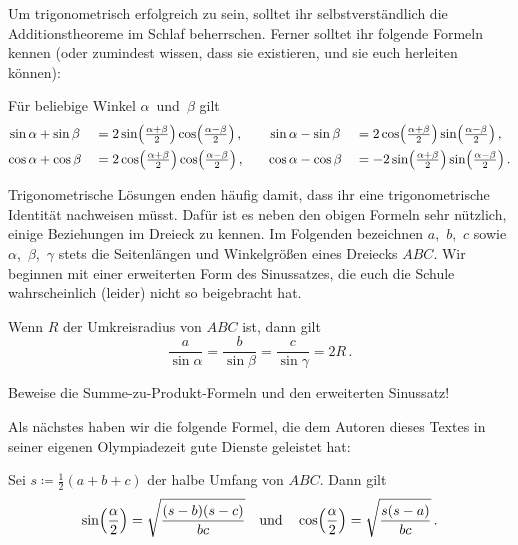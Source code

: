 Um trigonometrisch erfolgreich zu sein, solltet ihr selbstverständlich die Additionstheoreme im Schlaf beherrschen.
Ferner solltet ihr folgende Formeln kennen (oder zumindest wissen, dass sie existieren, und sie euch herleiten können):
\begin{satzmitnamen}
	Für beliebige Winkel $\alpha$~und~$\beta$ gilt
	\begin{alignat*}{4}
		\sin\alpha&+\sin\beta &&= 2\sin\parens*{\tfrac{\alpha+\beta}{2}}\cos\parens*{\tfrac{\alpha-\beta}{2}}\,, & \sin\alpha&-\sin\beta &&= 2\cos\parens*{\tfrac{\alpha+\beta}{2}}\sin\parens*{\tfrac{\alpha-\beta}{2}}\,,\\
		\cos\alpha&+\cos\beta &&= 2\cos\parens*{\tfrac{\alpha+\beta}{2}}\cos\parens*{\tfrac{\alpha-\beta}{2}}\,,\quad & \cos\alpha&-\cos\beta &&= -2\sin\parens*{\tfrac{\alpha+\beta}{2}}\sin\parens*{\tfrac{\alpha-\beta}{2}}\,.
	\end{alignat*}
\end{satzmitnamen}

Trigonometrische Lösungen enden häufig damit, dass ihr eine trigonometrische Identität nachweisen müsst. Dafür ist es neben den obigen Formeln sehr nützlich, einige Beziehungen im Dreieck zu kennen. Im Folgenden bezeichnen $a$,~$b$,~$c$ sowie $\alpha$,~$\beta$,~$\gamma$ stets die Seitenlängen und Winkelgrößen eines Dreiecks $ABC$. Wir beginnen mit einer erweiterten Form des Sinussatzes, die euch die Schule wahrscheinlich (leider) nicht so beigebracht hat.

\begin{satzmitnamen}
	Wenn $R$ der Umkreisradius von $ABC$ ist, dann gilt
	\begin{equation*}
		\frac{a}{\sin\alpha}=\frac{b}{\sin\beta}=\frac{c}{\sin\gamma}=2R\,.
	\end{equation*}
\end{satzmitnamen}

\begin{aufgabe*}
	Beweise die Summe-zu-Produkt-Formeln und den erweiterten Sinussatz!
\end{aufgabe*}

Als nächstes haben wir die folgende Formel, die dem Autoren dieses Textes in seiner eigenen Olympiadezeit gute Dienste geleistet hat:
\begin{satzmitnamen}[Halbwinkelformel]
	Sei $s\coloneqq \frac12(a+b+c)$ der halbe Umfang von $ABC$. Dann gilt
	\begin{equation*}
		\sin\parens*{\frac{\alpha}{2}}=\sqrt{\frac{(s-b)(s-c)}{bc}}\quad\text{und}\quad\cos\parens*{\frac{\alpha}{2}}=\sqrt{\frac{s(s-a)}{bc}}\,.
	\end{equation*}
\end{satzmitnamen}

